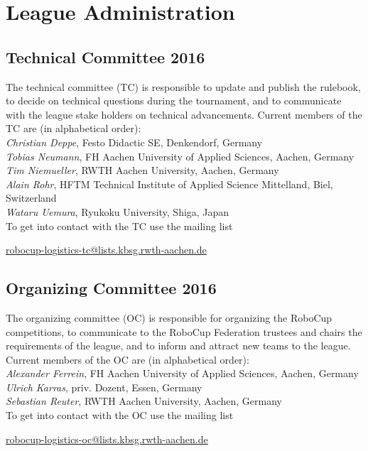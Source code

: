 \documentclass[12pt,twoside]{article}
\begin{document}
\section{League Administration} \label{sec:commitees}
\subsection{Technical Committee 2016}
\label{sec:tc}
The technical committee (TC) is responsible to update and publish the
rulebook, to decide on technical questions during the tournament, and
to communicate with the league stake holders on technical
advancements. Current members of the TC are (in alphabetical order):\\[.5em]
\emph{Christian Deppe}, Festo Didactic SE, Denkendorf, Germany\\
\emph{Tobias Neumann}, FH Aachen University of Applied Sciences,
Aachen, Germany\\
\emph{Tim Niemueller}, RWTH Aachen University, Aachen, Germany\\
\emph{Alain Rohr}, HFTM Technical Institute of Applied Science Mittelland, Biel, Switzerland\\
\emph{Wataru Uemura}, Ryukoku University, Shiga, Japan\\[.5em]
To get into contact with the TC use the mailing list\\
\centerline{\url{robocup-logistics-tc@lists.kbsg.rwth-aachen.de}}

\subsection{Organizing Committee 2016}
\label{sec:oc}
The organizing committee (OC) is responsible for organizing the
RoboCup competitions, to communicate to the RoboCup Federation
trustees and chairs the requirements of the league, and to inform and
attract new teams to the league. Current members of the OC are (in
alphabetical order):\\[.5em]
\emph{Alexander Ferrein}, FH Aachen University of Applied Sciences, Aachen, Germany\\
\emph{Ulrich Karras}, priv. Dozent, Essen, Germany\\
\emph{Sebastian Reuter}, RWTH Aachen University, Aachen, Germany\\[.5em]
To get into contact with the OC use the mailing list\\
\centerline{\url{robocup-logistics-oc@lists.kbsg.rwth-aachen.de}}
\end{document}
